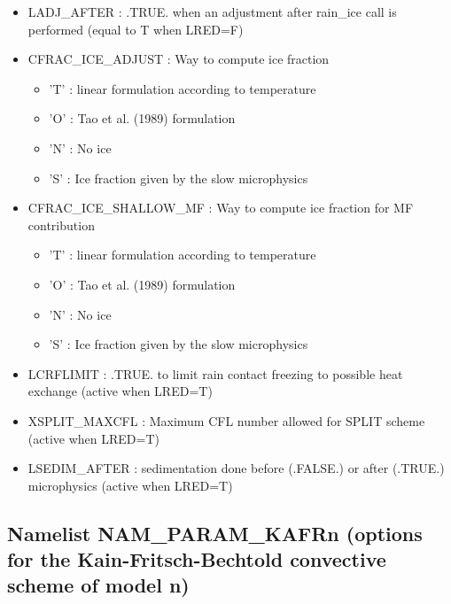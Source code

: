 \begin{itemize}
\item 
LADJ\_AFTER  : .TRUE. when an adjustment after rain\_ice call is performed (equal to T when LRED=F)

\item 
CFRAC\_ICE\_ADJUST   : Way to compute ice fraction 
\begin{itemize}
\item{'T'} : linear formulation according to temperature
\item{'O'} : Tao et al. (1989) formulation
\item{'N'} : No ice
\item{'S'} : Ice fraction given by the slow microphysics
\end{itemize}

\item 
CFRAC\_ICE\_SHALLOW\_MF : Way to compute ice fraction for MF contribution
\begin{itemize}
\item{'T'} : linear formulation according to temperature
\item{'O'} : Tao et al. (1989) formulation
\item{'N'} : No ice
\item{'S'} : Ice fraction given by the slow microphysics
\end{itemize}

\item 
LCRFLIMIT  : .TRUE. to limit rain contact freezing to possible heat exchange (active when LRED=T)

\item 
XSPLIT\_MAXCFL : Maximum CFL number allowed for SPLIT scheme (active when LRED=T)

\item 
LSEDIM\_AFTER  : sedimentation done before (.FALSE.) or after (.TRUE.) microphysics (active when LRED=T)

\end{itemize}
\subsection{Namelist NAM\_PARAM\_KAFRn (options for the Kain-Fritsch-Bechtold convective
scheme of model n)}

